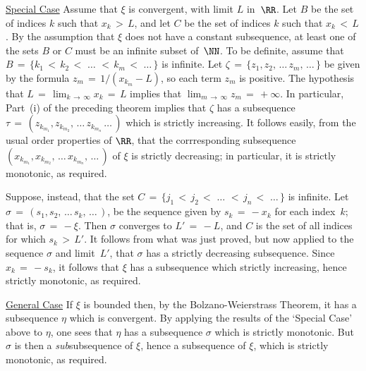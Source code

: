         \underline{Special Case} Assume that ${\xi}$ is convergent, with limit $L$ in~${\RR}$.
    Let $B$ be the set of indices $k$ such that $x_{k}\,>\,L$, and let $C$ be the set of indices $k$ such that $x_{k}\,<\,L$.
    By the assumption that ${\xi}$ does not have a constant subsequence, at least one of the sets $B$ or $C$ must be an infinite subset of~${\NN}$.
    To be definite, assume that $B \,=\,
    \{k_{1}\,<\,k_{2}\,<\,\,{\ldots}\,\,<\,k_{m}\,<\,\,{\ldots}\,\}$ is infinite.
    Let ${\zeta} \,=\, \{z_{1}, z_{2},\,{\ldots}\,z_{m},\,{\ldots}\,\}$ be given by the formula
    $z_{m} \,=\, 1/(x_{k_{m}}-L)$, so each term $z_{m}$ is positive. The hypothesis that
    $L \,=\, \lim_{k \,{\rightarrow}\, {\infty}} x_{k} \,=\, L$ implies that $\lim_{m \,{\rightarrow}\, {\infty}} z_{m} \,=\, +{\infty}$.
    In particular, Part~(i) of the preceding theorem implies that ${\zeta}$ has a subsequence
    ${\tau} \,=\, (z_{k_{m_{1}}}, z_{k_{m_{2}}},\,{\ldots}\,z_{k_{m_{n}}}\,{\ldots}\,)$
    which is strictly increasing. It follows easily, from the usual order properties of ${\RR}$,
    that the corrresponding subsequence $(x_{k_{m_{1}}}, x_{k_{m_{2}}},\,{\ldots}\,x_{k_{m_{n}}},\,{\ldots}\,)$
    of ${\xi}$ is strictly decreasing; in particular, it is strictly monotonic, as required.

        Suppose, instead, that the set $C \,=\, \{j_{1}\,<\,j_{2}\,<\,\,{\ldots}\,\,<\,j_{n}\,<\,\,{\ldots}\,\}$
    is infinite. Let ${\sigma} \,=\, (s_{1}, s_{2},\,{\ldots}\,s_{k},\,{\ldots}\,)$, be the sequence given by
    $s_{k} \,=\, -x_{k}$ for each index~$k$; that is, ${\sigma} \,=\, -{\xi}$. Then ${\sigma}$ converges to $L' \,=\, -L$,
    and $C$ is the set of all indices for which $s_{k}\,>\,L'$. It follows from what was just proved, but now applied to the sequence ${\sigma}$ and limit~$L'$,
    that ${\sigma}$ has a strictly decreasing subsequence. Since $x_{k} \,=\, -s_{k}$,
    it follows that ${\xi}$ has a subsequence which strictly increasing, hence strictly monotonic, as required.

\V

        \underline{General Case} If ${\xi}$ is bounded then, by the Bolzano-Weierstrass Theorem, it has a subsequence ${\eta}$ which is convergent.
    By applying the results of the `Special Case' above to ${\eta}$, one sees that ${\eta}$ has a subsequence ${\sigma}$ which is strictly monotonic.
    But ${\sigma}$ is then a {\em sub}subsequence of ${\xi}$, hence a subsequence of ${\xi}$, which is strictly monotonic, as required.

